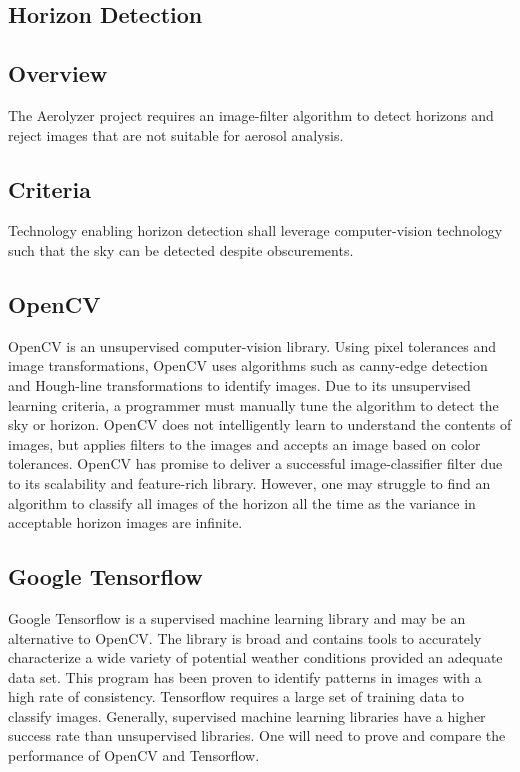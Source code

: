 \documentclass[journal,10pt,draftclsnofoot,onecolumn]{IEEEtran}
\begin{document}
\begin{singlespace}

\section{Horizon Detection}
	\subsection{Overview}
	The Aerolyzer project requires an image-filter algorithm to detect horizons and reject images that are not suitable for aerosol analysis.
	
	\subsection{Criteria}
	Technology enabling horizon detection shall leverage computer-vision technology such that the sky can be detected despite obscurements.

	\subsection{OpenCV}
	OpenCV is an unsupervised computer-vision library.
	Using pixel tolerances and image transformations, OpenCV uses algorithms such as canny-edge detection and Hough-line transformations to identify images.
	Due to its unsupervised learning criteria, a programmer must manually tune the algorithm to detect the sky or horizon.
	OpenCV does not intelligently learn to understand the contents of images, but applies filters to the images and accepts an image based on color tolerances.
	OpenCV has promise to deliver a successful image-classifier filter due to its scalability and feature-rich library.
	However, one may struggle to find an algorithm to classify all images of the horizon all the time as the variance in acceptable horizon images are infinite.

	\subsection{Google Tensorflow}
	Google Tensorflow is a supervised machine learning library and may be an alternative to OpenCV.
	The library is broad and contains tools to accurately characterize a wide variety of potential weather conditions provided an adequate data set.
	This program has been proven to identify patterns in images with a high rate of consistency.
	Tensorflow requires a large set of training data to classify images.
	Generally, supervised machine learning libraries have a higher success rate than unsupervised libraries.
	One will need to prove and compare the performance of OpenCV and Tensorflow.


\end{singlespace}
\end{document}
